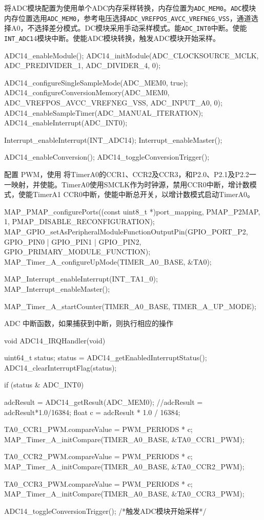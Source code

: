 \documentclass[a4paper,10pt,UTF8]{paper}
\numberwithin{equation}{section}
\numberwithin{figure}{section}
\begin{document}
将ADC模块配置为使用单个ADC内存采样转换，内存位置为\texttt{ADC\_MEM0}。\texttt{ADC}模块内存位置选用\texttt{ADC\_MEM0}，参考电压选择\texttt{ADC\_VREFPOS\_AVCC\_VREFNEG\_VSS}，通道选择A0，不选择差分模式。DC模块采用手动采样模式。能\texttt{ADC\_INT0}中断。使能\texttt{INT\_ADC1}4模块中断。使能ADC模块转换，触发ADC模块开始采样。

\begin{ccode}
    ADC14_enableModule(); 
    ADC14_initModule(ADC_CLOCKSOURCE_MCLK, ADC_PREDIVIDER_1, ADC_DIVIDER_4, 0); 

    ADC14_configureSingleSampleMode(ADC_MEM0, true);  
    ADC14_configureConversionMemory(ADC_MEM0, 
    ADC_VREFPOS_AVCC_VREFNEG_VSS, ADC_INPUT_A0, 0);
    ADC14_enableSampleTimer(ADC_MANUAL_ITERATION);
    ADC14_enableInterrupt(ADC_INT0);  

    Interrupt_enableInterrupt(INT_ADC14);
    Interrupt_enableMaster();  

    ADC14_enableConversion();  
    ADC14_toggleConversionTrigger();
\end{ccode}

配置 PWM，使用 将TimerA0的CCR1、CCR2及CCR3，和P2.0、P2.1及P2.2一一映射，并使能。TimerA0使用SMCLK作为时钟源，禁用CCR0中断，增计数模式，使能TimerA1 CCR0中断，使能中断总开关，以增计数模式启动TimerA0。

\begin{ccode}
    MAP_PMAP_configurePorts((const uint8_t *)port_mapping, PMAP_P2MAP,
     1, PMAP_DISABLE_RECONFIGURATION);
    MAP_GPIO_setAsPeripheralModuleFunctionOutputPin(GPIO_PORT_P2,
     GPIO_PIN0 | GPIO_PIN1 | GPIO_PIN2, GPIO_PRIMARY_MODULE_FUNCTION);
    MAP_Timer_A_configureUpMode(TIMER_A0_BASE, &TA0);

    MAP_Interrupt_enableInterrupt(INT_TA1_0); 
    MAP_Interrupt_enableMaster();   

    MAP_Timer_A_startCounter(TIMER_A0_BASE, TIMER_A_UP_MODE);
\end{ccode}

ADC 中断函数，如果捕获到中断，则执行相应的操作

\begin{ccode}
    void ADC14_IRQHandler(void)
    {
        uint64_t status;
        status = ADC14_getEnabledInterruptStatus();
        ADC14_clearInterruptFlag(status);

        if (status & ADC_INT0)
        {
            adcResult = ADC14_getResult(ADC_MEM0); 
            //adcResult = adcResult*1.0/16384;
            float c = adcResult * 1.0 / 16384;

            TA0_CCR1_PWM.compareValue = PWM_PERIODS * c;
            MAP_Timer_A_initCompare(TIMER_A0_BASE, &TA0_CCR1_PWM); 

            TA0_CCR2_PWM.compareValue = PWM_PERIODS * c;
            MAP_Timer_A_initCompare(TIMER_A0_BASE, &TA0_CCR2_PWM);

            TA0_CCR3_PWM.compareValue = PWM_PERIODS * c;
            MAP_Timer_A_initCompare(TIMER_A0_BASE, &TA0_CCR3_PWM);

            ADC14_toggleConversionTrigger(); /*触发ADC模块开始采样*/
        }
    }

\end{ccode}
\end{document}
